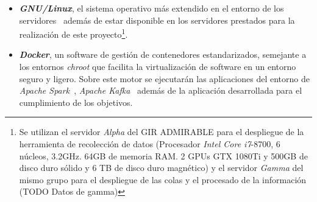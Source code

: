 \begin{itemize}
	\item \textit{\textbf{GNU/Linux}}, el sistema operativo más extendido en el entorno de los servidores~\cite{noauthorred2018, zhang2000linux} además de estar disponible en los servidores prestados para la realización de este proyecto\footnote{Se utilizan el servidor \textit{Alpha} del GIR ADMIRABLE para el despliegue de la herramienta de recolección de datos (Procesador \textit{Intel Core i7}-8700, 6 núcleos, 3.2GHz. 64GB de memoria RAM. 2 GPUs GTX 1080Ti y 500GB de disco duro sólido y 6 TB de disco duro magnético) y el servidor \textit{Gamma} del mismo grupo para el despliegue de las colas y el procesado de la información (TODO Datos de gamma)}.
	\item \textit{\textbf{Docker}}, un software de gestión de contenedores estandarizados, semejante a los entornos \textit{chroot} que facilita la virtualización de software en un entorno seguro y ligero. Sobre este motor se ejecutarán las aplicaciones del entorno de \textit{Apache Spark}~\cite{juez2019docker}, \textit{Apache Kafka}~\cite{wurstmeister2019kafka} además de la aplicación desarrollada para el cumplimiento de los objetivos.
\end{itemize}
